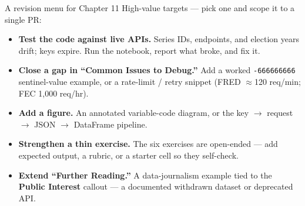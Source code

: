 \documentclass[9pt,aspectratio=169]{beamer}
\begin{document}
\begin{frame}{A revision menu for Chapter 11}
    High-value targets --- pick one and scope it to a single PR:
    \begin{itemize}
        \item \textbf{Test the code against live APIs.} Series IDs, endpoints, and election years drift; keys expire. Run the notebook, report what broke, and fix it.
        \item \textbf{Close a gap in ``Common Issues to Debug.''} Add a worked \texttt{-666666666} sentinel-value example, or a rate-limit / retry snippet (FRED $\approx$120 req/min; FEC 1,000 req/hr).
        \item \textbf{Add a figure.} An annotated variable-code diagram, or the key $\rightarrow$ request $\rightarrow$ JSON $\rightarrow$ DataFrame pipeline.
        \item \textbf{Strengthen a thin exercise.} The six exercises are open-ended --- add expected output, a rubric, or a starter cell so they self-check.
        \item \textbf{Extend ``Further Reading.''} A data-journalism example tied to the \textbf{Public Interest} callout --- a documented withdrawn dataset or deprecated API.
    \end{itemize}
\end{frame}
\end{document}
